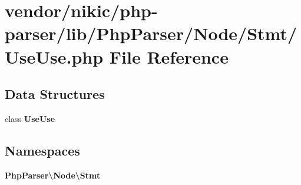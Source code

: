 \section{vendor/nikic/php-\/parser/lib/\+Php\+Parser/\+Node/\+Stmt/\+Use\+Use.php File Reference}
\label{_use_use_8php}
\subsection*{Data Structures}
\begin{DoxyCompactItemize}
\item 
class {\bf Use\+Use}
\end{DoxyCompactItemize}
\subsection*{Namespaces}
\begin{DoxyCompactItemize}
\item 
 {\bf Php\+Parser\textbackslash{}\+Node\textbackslash{}\+Stmt}
\end{DoxyCompactItemize}
